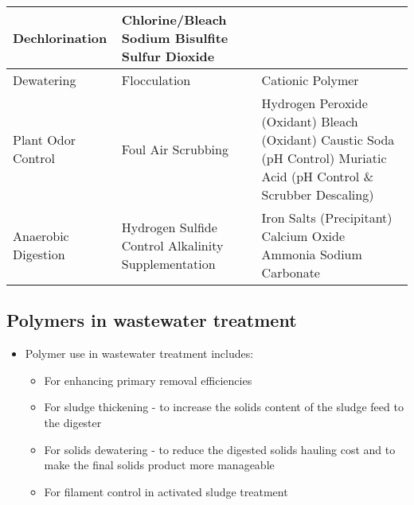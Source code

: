 \begin{tabular}{ |p{4cm}|p{4.5cm}|p{6.5cm}|  }
Dechlorination & Chlorine/Bleach \newline Sodium Bisulfite  \newline Sulfur Dioxide   \\
\hline
Dewatering & Flocculation & Cationic Polymer \\
\hline
Plant Odor Control & Foul Air Scrubbing & Hydrogen Peroxide (Oxidant) \newline Bleach (Oxidant) \newline Caustic Soda (pH Control) \newline Muriatic Acid (pH Control \& Scrubber Descaling)\\
\hline
Anaerobic Digestion & Hydrogen Sulfide Control \newline Alkalinity Supplementation & Iron Salts (Precipitant) \newline Calcium Oxide \newline Ammonia \newline Sodium Carbonate \\
\hline
\end{tabular}


\subsection{Polymers in wastewater treatment} 
        	\begin{itemize}
        		\item Polymer use in wastewater treatment includes:
        			\begin{itemize}
        				\item For enhancing primary removal efficiencies
        				\item For sludge thickening - to increase the solids content of the sludge feed to the digester
        				\item For solids dewatering - to reduce the digested solids hauling cost and to make the final solids product more manageable
        				\item For filament control in activated sludge treatment
        			\end{itemize}
        	\end{itemize}
  

